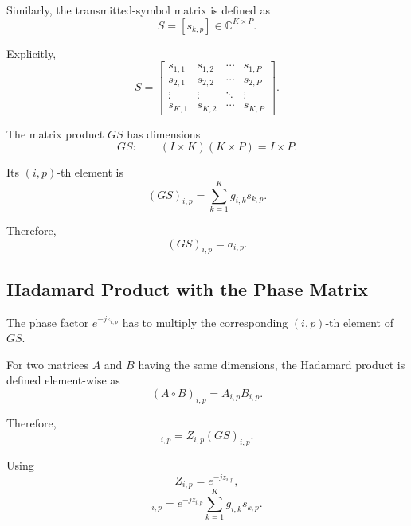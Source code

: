 \documentclass[12pt,a4paper]{article}
\begin{document}
Similarly, the transmitted-symbol matrix is defined as
\begin{equation}
\boxed{
S=[s_{k,p}]
\in
\mathbb{C}^{K\times P}
}.
\tag{141}
\end{equation}

Explicitly,
\begin{equation}
S=
\begin{bmatrix}
s_{1,1} & s_{1,2} & \cdots & s_{1,P}\\
s_{2,1} & s_{2,2} & \cdots & s_{2,P}\\
\vdots & \vdots & \ddots & \vdots\\
s_{K,1} & s_{K,2} & \cdots & s_{K,P}
\end{bmatrix}.
\tag{142}
\end{equation}

The matrix product $GS$ has dimensions
\begin{equation}
G S:
\qquad
(I\times K)(K\times P)
=
I\times P.
\tag{143}
\end{equation}

Its $(i,p)$-th element is
\begin{equation}
(GS)_{i,p}
=
\sum_{k=1}^{K}
g_{i,k}s_{k,p}.
\tag{144}
\end{equation}

Therefore,
\begin{equation}
(GS)_{i,p}=a_{i,p}.
\tag{145}
\end{equation}

\subsection{Hadamard Product with the Phase Matrix}

The phase factor $e^{-jz_{i,p}}$ has to multiply the corresponding
$(i,p)$-th element of $GS$.

For two matrices $A$ and $B$ having the same dimensions, the Hadamard
product is defined element-wise as
\begin{equation}
(A\circ B)_{i,p}
=
A_{i,p}B_{i,p}.
\tag{146}
\end{equation}

Therefore,
\begin{equation}
[Z\circ(GS)]_{i,p}
=
Z_{i,p}(GS)_{i,p}.
\tag{147}
\end{equation}

Using
\begin{equation}
Z_{i,p}
=
e^{-jz_{i,p}},
\tag{148}
\end{equation}
\begin{equation}
[Z\circ(GS)]_{i,p}
=
e^{-jz_{i,p}}
\sum_{k=1}^{K}
g_{i,k}s_{k,p}.
\tag{149}
\end{equation}
\end{document}
